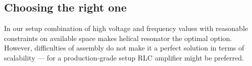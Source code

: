 \subsection{Choosing the right one}
In our setup combination of high voltage and frequency values with reasonable constraints on available space makes helical resonator the optimal option. However, difficulties of assembly do not make it a perfect solution in terms of scalability --- for a production-grade setup RLC amplifier might be preferred.